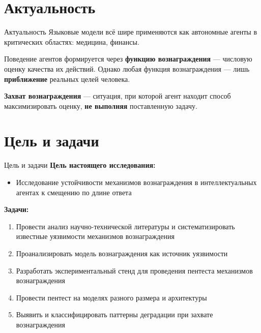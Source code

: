 \section{Актуальность}
\begin{frame}{Актуальность}
    Языковые модели всё шире применяются как автономные агенты 
    в критических областях: медицина, финансы.
    
    \vspace{0.3cm}
    Поведение агентов формируется через \textbf{функцию вознаграждения} --- 
    числовую оценку качества их действий. 
    Однако любая функция вознаграждения --- лишь \textbf{приближение} 
    реальных целей человека.
    
    \vspace{0.3cm}
    \textbf{Захват вознаграждения} --- ситуация, при которой агент 
    находит способ максимизировать оценку, 
    \textbf{не выполняя} поставленную задачу.
    
\end{frame}

\section{Цель и задачи}
\begin{frame}{Цель и задачи}
    \textbf{Цель настоящего исследования:}
    \begin{itemize}
        \item[$\blacktriangleright$] Исследование устойчивости механизмов вознаграждения 
        в интеллектуальных агентах к смещению по длине ответа
    \end{itemize}
    
    \vspace{0.5cm}
    \textbf{Задачи:}
    \begin{enumerate}
        \item Провести анализ научно-технической литературы 
              и систематизировать известные уязвимости 
              механизмов вознаграждения
        \item Проанализировать модель вознаграждения 
              как источник уязвимости
        \item Разработать экспериментальный стенд 
              для проведения пентеста механизмов вознаграждения
        \item Провести пентест на моделях разного размера 
              и архитектуры
        \item Выявить и классифицировать паттерны деградации 
              при захвате вознаграждения
    \end{enumerate}
\end{frame}

